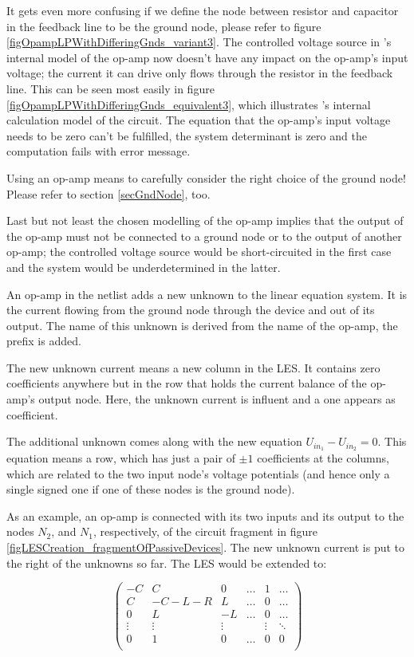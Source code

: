 It gets even more confusing if we define the node between resistor and
capacitor in the feedback line to be the ground node, please refer to
figure \ref{figOpampLPWithDifferingGnds_variant3}. The controlled voltage
source in \linnet{}'s internal model of the op-amp now doesn't have any
impact on the op-amp's input voltage; the current it can drive only flows
through the resistor in the feedback line. This can be seen most easily in
figure \ref{figOpampLPWithDifferingGnds_equivalent3}, which illustrates
\linnet's internal calculation model of the circuit. The equation that the
op-amp's input voltage needs to be zero can't be fulfilled, the system
determinant is zero and the computation fails with error message.

Using an op-amp means to carefully consider the right choice of the ground
node! Please refer to section \ref{secGndNode}, too.

Last but not least the chosen modelling of the op-amp implies that the
output of the op-amp must not be connected to a ground node or to the
output of another op-amp; the controlled voltage source would be
short-circuited in the first case and the system would be underdetermined
in the latter.

An op-amp in the netlist adds a new unknown to the linear equation
system. It is the current flowing from the ground node through the device
and out of its output. The name of this unknown is derived from the name
of the op-amp, the prefix  is added. 

The new unknown current means a new column in the LES. It contains zero
coefficients anywhere but in the row that holds the current balance
of the op-amp's output node. Here, the unknown current is influent and a
one appears as coefficient.

The additional unknown comes along with the new equation $U_{in_1} -
U_{in_2} = 0$. This equation means a row, which has just a pair of $\pm 1$
coefficients at the columns, which are related to the two input node's
voltage potentials (and hence only a single signed one if one of these
nodes is the ground node).

As an example, an op-amp  is connected with its two inputs and
its output to the nodes $N_2$,  and $N_1$, respectively, of the
circuit fragment in figure \ref{figLESCreation_fragmentOfPassiveDevices}.
The new unknown current  is put to the right of the unknowns
so far. The LES would be extended to:

\begin{displaymath}
\left(
\begin{array}{cccccc}
-C      & C      &  0     & \ldots & 1      & \ldots \\
 C      & -C-L-R &  L     & \ldots & 0      & \ldots \\
 0      &    L   & -L     & \ldots & 0      & \ldots \\
 \vdots & \vdots & \vdots &        & \vdots & \ddots \\
 0      & 1      & 0      & \ldots & 0      & 0      \\
\end{array}
\right)
\end{displaymath}


